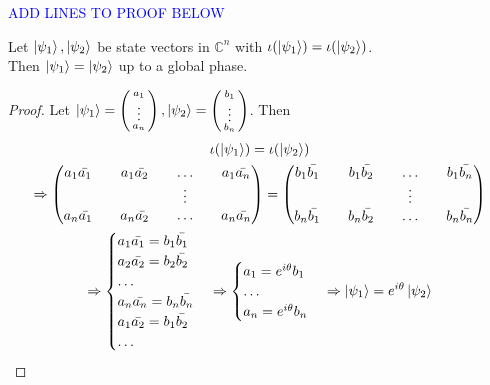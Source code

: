 \textcolor{blue}{ADD LINES TO PROOF BELOW}


\begin{lemma}
\label{lemma state into density}
Let $\ket{\psi_1}, \ket{\psi_2}$ be state vectors in ${\mathbb{C}}^n$ with $\iota({\ket{\psi_1}})=\iota(\ket{\psi_2})$.\\
Then $\ket{\psi_1}=\ket{\psi_2}$ up to a global phase.
\end{lemma}
\begin{proof}
Let $\ket{\psi_1}=\left(\begin{smallmatrix}a_1\\ \vdots \\ a_n\end{smallmatrix}\right), \ket{\psi_2}=\left(\begin{smallmatrix}b_1\\ \vdots \\ b_n\end{smallmatrix}\right)$. Then
\begin{gather}
\iota({\ket{\psi_1}})=\iota(\ket{\psi_2})\\
\Rightarrow \begin{pmatrix}
a_1 \Bar{a_1} && a_1 \Bar{a_2} && \hdots && a_1 \Bar{a_n}\\
&& && \vdots && \\
a_n \Bar{a_1} && a_n \Bar{a_2} && \hdots && a_n \Bar{a_n}\\              
\end{pmatrix}=\begin{pmatrix}
b_1 \Bar{b_1} && b_1 \Bar{b_2} && \hdots && b_1 \Bar{b_n}\\
&& && \vdots && \\
b_n \Bar{b_1} && b_n \Bar{b_2} && \hdots && b_n \Bar{b_n}\\ 
\end{pmatrix}\\
\Rightarrow 
\begin{cases}
a_1 \Bar{a_1}=b_1 \Bar{b_1}\\
a_2 \Bar{a_2}=b_2 \Bar{b_2}\\
\hdots\\
a_n \Bar{a_n}=b_n \Bar{b_n}\\
a_1 \Bar{a_2}=b_1 \Bar{b_2}\\
\hdots
\end{cases}
\Rightarrow \begin{cases}
a_1 = e^{i\theta}b_1\\
\hdots\\
a_n = e^{i\theta}b_n
\end{cases}
\Rightarrow\ket{\psi_1}=e^{i\theta}\ket{\psi_2}
\end{gather}
\end{proof}



